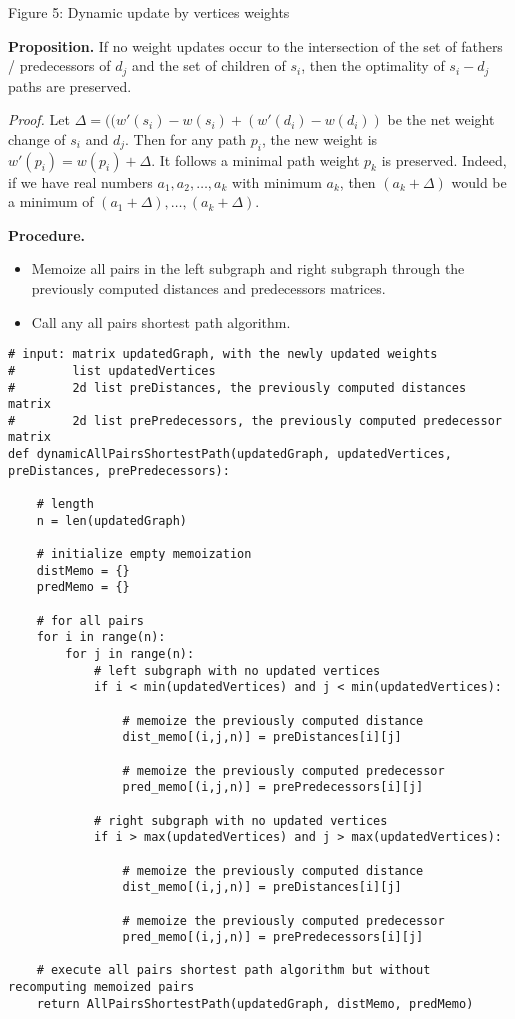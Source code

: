 \begin{center}
    
    Figure 5: Dynamic update by vertices weights
\end{center}

\textbf{Proposition.} If no weight updates occur to the intersection of the set of fathers / predecessors of $d_j$ and the set of children of $s_i$, then the optimality of $s_i-d_j$ paths are preserved.

\textit{Proof.} Let $\Delta = ((w'(s_i) - w(s_i) + (w'(d_i) - w(d_i))$ be the net weight change of $s_i$ and $d_j$. Then for any path $p_i$, the new weight is $w'(p_i) = w(p_i) + \Delta$. It follows a minimal path weight $p_k$ is preserved. Indeed, if we have real numbers $a_1, a_2, \dots, a_k$ with minimum $a_k$, then $(a_k + \Delta)$ would be a minimum of $(a_1 + \Delta), \dots, (a_k + \Delta)$.

\textbf{Procedure.}
\begin{itemize}
    \item Memoize all pairs in the left subgraph and right subgraph through the previously computed distances and predecessors matrices.
    \item Call any all pairs shortest path algorithm.
\end{itemize}

\begin{verbatim}
# input: matrix updatedGraph, with the newly updated weights
#        list updatedVertices
#        2d list preDistances, the previously computed distances matrix
#        2d list prePredecessors, the previously computed predecessor matrix
def dynamicAllPairsShortestPath(updatedGraph, updatedVertices, preDistances, prePredecessors):
    
    # length
    n = len(updatedGraph)
    
    # initialize empty memoization
    distMemo = {}
    predMemo = {}
    
    # for all pairs
    for i in range(n):
        for j in range(n):
            # left subgraph with no updated vertices
            if i < min(updatedVertices) and j < min(updatedVertices):
            
                # memoize the previously computed distance
                dist_memo[(i,j,n)] = preDistances[i][j]
                
                # memoize the previously computed predecessor
                pred_memo[(i,j,n)] = prePredecessors[i][j]
            
            # right subgraph with no updated vertices
            if i > max(updatedVertices) and j > max(updatedVertices):
            
                # memoize the previously computed distance
                dist_memo[(i,j,n)] = preDistances[i][j]
                
                # memoize the previously computed predecessor
                pred_memo[(i,j,n)] = prePredecessors[i][j]
    
    # execute all pairs shortest path algorithm but without recomputing memoized pairs
    return AllPairsShortestPath(updatedGraph, distMemo, predMemo)
\end{verbatim}

